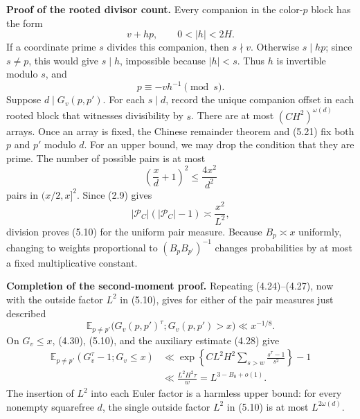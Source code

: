 \documentclass[10pt,letterpaper]{article}
\newcommand{\EE}{\mathbb{E}}
\newcommand{\PC}{\mathcal{P}_C}
\begin{document}
\textbf{Proof of the rooted divisor count.} Every companion in the color-$p$ block has the form
\begin{equation}
v+hp,\qquad0<|h|<2H.
\tag{5.20}
\end{equation}
If a coordinate prime $s$ divides this companion, then $s\nmid v$. Otherwise $s\mid hp$; since $s\ne p$, this would give $s\mid h$,
impossible because $|h|<s$. Thus $h$ is invertible modulo $s$, and
\begin{equation}
p\equiv-vh^{-1}\pmod s.
\tag{5.21}
\end{equation}
Suppose $d\mid G_v(p,p')$. For each $s\mid d$, record the unique companion offset in each rooted block that witnesses
divisibility by $s$. There are at most $(CH^2)^{\omega(d)}$ arrays. Once an array is fixed, the Chinese remainder theorem
and (5.21) fix both $p$ and $p'$ modulo $d$. For an upper bound, we may drop the condition that they are prime.
The number of possible pairs is at most
\[
\left(\frac xd+1\right)^2\le\frac{4x^2}{d^2}
\]
pairs in $(x/2,x]^2$. Since (2.9) gives
\[
|\PC|(|\PC|-1)\asymp\frac{x^2}{L^2},
\]
division proves (5.10) for the uniform pair measure. Because $B_p\asymp x$ uniformly, changing to weights
proportional to $(B_pB_{p'})^{-1}$ changes probabilities by at most a fixed multiplicative constant.

\textbf{Completion of the second-moment proof.} Repeating (4.24)--(4.27), now with the outside factor $L^2$ in
(5.10), gives for either of the pair measures just described
\begin{equation}
\EE_{p\ne p'}\bigl(G_v(p,p')^\tau;G_v(p,p')>x\bigr)\ll x^{-1/8}.
\tag{5.22}
\end{equation}
On $G_v\le x$, (4.30), (5.10), and the auxiliary estimate (4.28) give
\begin{equation}
\begin{aligned}
\EE_{p\ne p'}(G_v^\tau-1;G_v\le x)
&\ll\exp\left\{CL^2H^2\sum_{s>w}\frac{s^\tau-1}{s^2}\right\}-1\\
&\ll\frac{L^2H^2\tau}{w}=L^{3-B_0+o(1)}.
\end{aligned}
\tag{5.23}
\end{equation}
The insertion of $L^2$ into each Euler factor is a harmless upper bound: for every nonempty squarefree $d$, the
single outside factor $L^2$ in (5.10) is at most $L^{2\omega(d)}$.
\end{document}
